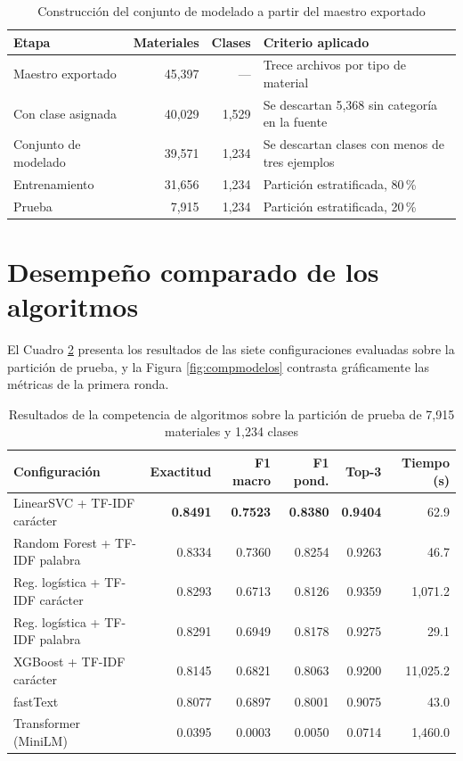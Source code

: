 \begin{table}[!htb]
\centering
\caption{Construcción del conjunto de modelado a partir del maestro exportado}
\label{cuadro:embudo}
\small
\begin{tabular}{lrrl}
\toprule
\textbf{Etapa} & \textbf{Materiales} & \textbf{Clases} & \textbf{Criterio aplicado} \\
\midrule
Maestro exportado        & 45,397 & ---   & Trece archivos por tipo de material \\
Con clase asignada       & 40,029 & 1,529 & Se descartan 5,368 sin categoría en la fuente \\
Conjunto de modelado     & 39,571 & 1,234 & Se descartan clases con menos de tres ejemplos \\
\midrule
\quad Entrenamiento      & 31,656 & 1,234 & Partición estratificada, 80\,\% \\
\quad Prueba             & 7,915  & 1,234 & Partición estratificada, 20\,\% \\
\bottomrule
\end{tabular}
\end{table}

\section{Desempeño comparado de los algoritmos}
El Cuadro \ref{cuadro:competencia} presenta los resultados de las siete configuraciones evaluadas sobre la partición de prueba, y la Figura \ref{fig:compmodelos} contrasta gráficamente las métricas de la primera ronda.

\begin{table}[!htb]
\centering
\caption{Resultados de la competencia de algoritmos sobre la partición de prueba de 7,915 materiales y 1,234 clases}
\label{cuadro:competencia}
\small
\begin{tabular}{lrrrrr}
\toprule
\textbf{Configuración} & \textbf{Exactitud} & \textbf{F1 macro} & \textbf{F1 pond.} & \textbf{Top-3} & \textbf{Tiempo (s)} \\
\midrule
LinearSVC + TF-IDF carácter   & \textbf{0.8491} & \textbf{0.7523} & \textbf{0.8380} & \textbf{0.9404} & 62.9 \\
Random Forest + TF-IDF palabra & 0.8334 & 0.7360 & 0.8254 & 0.9263 & 46.7 \\
Reg. logística + TF-IDF carácter & 0.8293 & 0.6713 & 0.8126 & 0.9359 & 1,071.2 \\
Reg. logística + TF-IDF palabra  & 0.8291 & 0.6949 & 0.8178 & 0.9275 & 29.1 \\
XGBoost + TF-IDF carácter      & 0.8145 & 0.6821 & 0.8063 & 0.9200 & 11,025.2 \\
fastText                       & 0.8077 & 0.6897 & 0.8001 & 0.9075 & 43.0 \\
Transformer (MiniLM)           & 0.0395 & 0.0003 & 0.0050 & 0.0714 & 1,460.0 \\
\bottomrule
\end{tabular}
\end{table}

